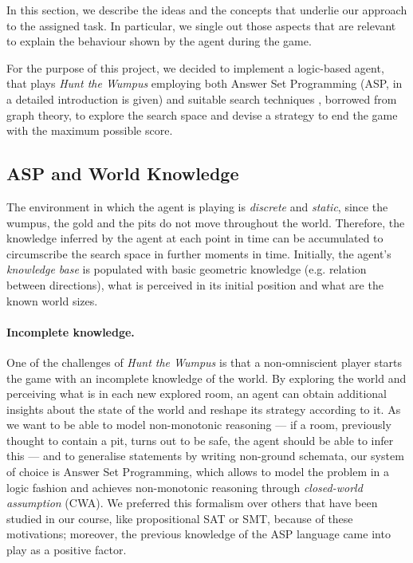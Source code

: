 \documentclass{llncs}
\newcommand{\htw}{\emph{Hunt the Wumpus}\xspace}
\begin{document}
In this section, we describe the ideas and the concepts that underlie our approach to the assigned task.
In particular, we single out those aspects that are relevant to explain the behaviour shown by the agent during the game.

For the purpose of this project, we decided to implement a logic-based agent, that plays \htw employing both Answer Set Programming (ASP, in~\cite{ASPprimer} a detailed introduction is given) and suitable search techniques , borrowed from graph theory, to explore the search space and devise a strategy to end the game with the maximum possible score.

\subsection{ASP and World Knowledge}

The environment in which the agent is playing is \emph{discrete} and \emph{static}, since the wumpus, the gold and the pits do not move throughout the world.
Therefore, the knowledge inferred by the agent at each point in time can be accumulated to circumscribe the search space in further moments in time.
Initially, the agent's \emph{knowledge base} is populated with basic geometric knowledge (e.g. relation between directions), what is perceived in its initial position and what are the known world sizes.

\paragraph{Incomplete knowledge.} One of the challenges of \htw is that a non-omniscient player starts the game with an incomplete knowledge of the world.
By exploring the world and perceiving what is in each new explored room, an agent can obtain additional insights about the state of the world and reshape its strategy according to it.
As we want to be able to model non-monotonic reasoning --- if a room, previously thought to contain a pit, turns out to be safe, the agent should be able to infer this --- and to generalise statements by writing non-ground schemata, our system of choice is Answer Set Programming, which allows to model the problem in a logic fashion and achieves non-monotonic reasoning through \emph{closed-world assumption} (CWA).
We preferred this formalism over others that have been studied in our course, like propositional SAT or SMT, because of these motivations; moreover, the previous knowledge of the ASP language came into play as a positive factor.
\end{document}
